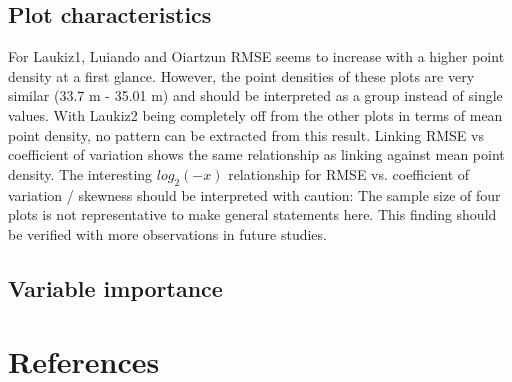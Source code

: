 \documentclass[review]{elsarticle}
\begin{document}
\subsection{Plot characteristics}

For Laukiz1, Luiando and Oiartzun \ac{RMSE} seems to increase with a higher point density at a first glance.
However, the point densities of these plots are very similar (33.7 m - 35.01 m) and should be interpreted as a group instead of single values.
With Laukiz2 being completely off from the other plots in terms of mean point density, no pattern can be extracted from this result.
Linking RMSE vs coefficient of variation shows the same relationship as linking against mean point density.
The interesting $log_{2}(-x)$ relationship for RMSE vs. coefficient of variation / skewness should be interpreted with caution: The sample size of four plots is not representative to make general statements here.
This finding should be verified with more observations in future studies.

\subsection{Variable importance}


\section*{References}


\end{document}
